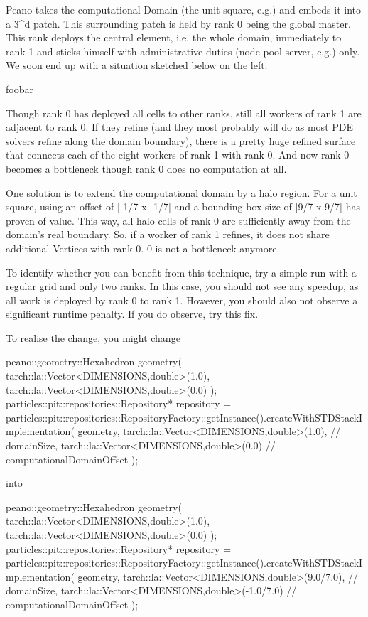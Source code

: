 Peano takes the computational Domain (the unit square, e.g.) and embeds it into a 3^d patch. This surrounding patch is held by rank 0 being the global master. This rank deploys the central element, i.e. the whole domain, immediately to rank 1 and sticks himself with administrative duties (node pool server, e.g.) only. We soon end up with a situation sketched below on the left:

foobar

Though rank 0 has deployed all cells to other ranks, still all workers of rank 1 are adjacent to rank 0. If they refine (and they most probably will do as most PDE solvers refine along the domain boundary), there is a pretty huge refined surface that connects each of the eight workers of rank 1 with rank 0. And now rank 0 becomes a bottleneck though rank 0 does no computation at all.

One solution is to extend the computational domain by a halo region. For a unit square, using an offset of [-1/7 x -1/7] and a bounding box size of [9/7 x 9/7] has proven of value. This way, all halo cells of rank 0 are sufficiently away from the domain's real boundary. So, if a worker of rank 1 refines, it does not share additional Vertices with rank 0. 0 is not a bottleneck anymore.

To identify whether you can benefit from this technique, try a simple run with a regular grid and only two ranks. In this case, you should not see any speedup, as all work is deployed by rank 0 to rank 1. However, you should also not observe a significant runtime penalty. If you do observe, try this fix.

To realise the change, you might change

peano::geometry::Hexahedron geometry(
  tarch::la::Vector<DIMENSIONS,double>(1.0),
  tarch::la::Vector<DIMENSIONS,double>(0.0)
 );
particles::pit::repositories::Repository* repository = 
    particles::pit::repositories::RepositoryFactory::getInstance().createWithSTDStackImplementation(
    geometry,
    tarch::la::Vector<DIMENSIONS,double>(1.0),   // domainSize,
    tarch::la::Vector<DIMENSIONS,double>(0.0)    // computationalDomainOffset
  );

into

peano::geometry::Hexahedron geometry(
  tarch::la::Vector<DIMENSIONS,double>(1.0),
  tarch::la::Vector<DIMENSIONS,double>(0.0)
 );
particles::pit::repositories::Repository* repository = 
    particles::pit::repositories::RepositoryFactory::getInstance().createWithSTDStackImplementation(
    geometry,
    tarch::la::Vector<DIMENSIONS,double>(9.0/7.0),   // domainSize,
    tarch::la::Vector<DIMENSIONS,double>(-1.0/7.0)    // computationalDomainOffset
  );

